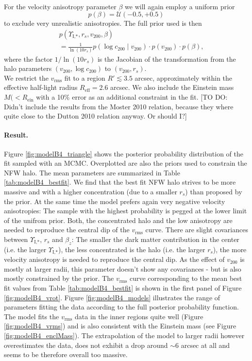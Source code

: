 \\For the velocity anisotropy parameter $\beta$ we will again employ a uniform prior 
\begin{equation*}
p(\beta) = \mathscr{U}(-0.5,+0.5)
\end{equation*}
to exclude very unrealistic anisotropies. The full prior used is then
\begin{eqnarray*}
&&p(\Upsilon_\text{I,*},r_s,v_{200},\beta) \\
&&= \frac{1}{\ln\left( 10 r_s\right)} p(\log c_{200} \mid v_{200}) \cdot p(v_{200}) \cdot p(\beta), 
\end{eqnarray*}
where the factor $1/\ln\left( 10 r_s\right)$ is the Jacobian of the transformation from the halo parameters $(v_{200},\log c_{200})$ to $(v_{200},r_s)$.
\\We restrict the $v_\text{rms}$ fit to a region $R' \lesssim 3.5$ arcsec, approximately within the effective half-light radius $R_\text{eff} = 2.6$ arcsec. We also include the Einstein mass $M(<R_\text{ein}$ with a 10\% error as an additional constraint in the fit. [TO DO: Didn't include the results from the Moster 2010 relation, because they where quite close to the Dutton 2010 relation anyway. Or should I?]


\paragraph{Result.} Figure \ref{fig:modelB4_triangle} shows the posterior probability distribution of the fit sampled with an MCMC. Overplotted are also the priors used to constrain the NFW halo. The mean parameters are summarized in Table \ref{tab:modelB4_bestfit}. We find that the best fit NFW halo strives to be more massive and with a higher concentration (due to a smaller $r_s$) than  proposed by the prior. At the same time the model prefers again very negative velocity anisotropies: The sample with the highest probability is pegged at the lower limit of the unifrom prior. Both, the concentrated halo and the low anisotropy are needed to reproduce the central dip of the $v_\text{rms}$ curve. There are slight covariances between $\Upsilon_\text{I,*}$,  $r_s$ and $\beta_z$: The smaller the dark matter contribution in the center (i.e. the larger $\Upsilon_\text{I,*}$), the less concentrated is the halo (i.e. the larger $r_s$), the more velocity anisotropy is needed to reproduce the central dip. As the effect of $v_{200}$ is mostly at larger radii, this parameter doesn't show any covariances - but is also mostly constrained by the prior. The $v_\text{rms}$ curve corresponding to the mean best fit values from Table \ref{tab:modelB4_bestfit} is shown in the first panel of Figure \ref{fig:modelB4_vrot}. Figure \ref{fig:modelB4_models} illustrates the range of parameters fitting the data according to the full posterior probability function. The model fits the $v_\text{rms}$ data in the inner regions quite well (Figure \ref{fig:modelB4_vrms}) and is also consistent with the Einstein mass (see Figure \ref{fig:modelB4_enclMass}). The extrapolation of the model to larger radii however overestimates the data, does not exhibit a drop around $\sim 6$ arcsec at all and seems to be therefore overall too massive.\\

